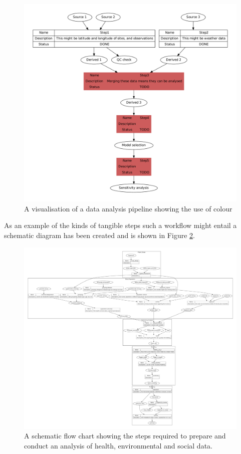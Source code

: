 \documentclass[11pt,a4paper]{article}
\begin{document}
\begin{figure}[!h]
\centering
\includegraphics[width=\textwidth]{images/steps-fig1.pdf}
\caption{A visualisation of a data analysis pipeline showing the use of colour}
\label{fig:FigSteps}
\end{figure}

\clearpage

As an example of the kinds of tangible steps such a workflow might
entail a schematic diagram has been created and is shown in Figure
\ref{fig:envepi_data_pipeline.png}.

\begin{figure}[!h]
\centering
\includegraphics[width=\textwidth]{images/envepi_data_pipeline.pdf}
\caption{A schematic flow chart showing the steps required to prepare and
conduct an analysis of health, environmental and social data.}       
\label{fig:envepi_data_pipeline.png}
\end{figure}
\end{document}
